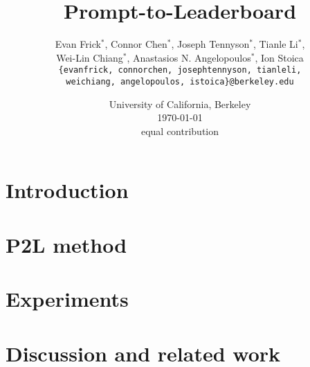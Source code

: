\documentclass{article}
\title{Prompt-to-Leaderboard}
\author{Evan Frick$^*$, Connor Chen$^*$, Joseph Tennyson$^*$, Tianle Li$^*$,\\ Wei-Lin Chiang$^*$, Anastasios N. Angelopoulos$^*$, Ion Stoica\\\texttt{\{evanfrick, connorchen, josephtennyson, tianleli,}\\\texttt{weichiang, angelopoulos, istoica\}@berkeley.edu}}
\date{University of California, Berkeley\\ \today\\{\small *equal contribution}}
\begin{document}
\maketitle

\begin{abstract}
    
\end{abstract}

\section{Introduction}


\section{P2L method}
\label{sec:methods}


\section{Experiments}
\label{sec:experiments}


\section{Discussion and related work}





\clearpage
\appendix

\end{document}
